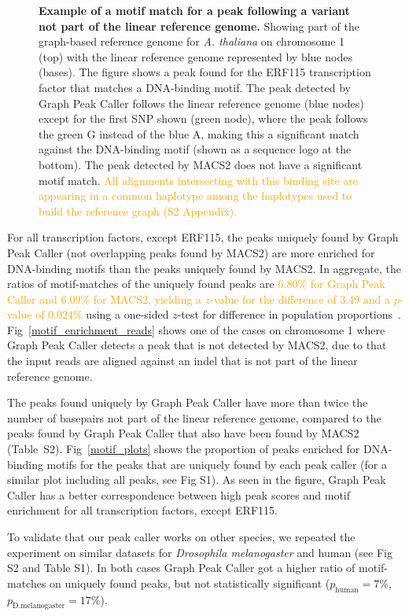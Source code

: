 \documentclass[10pt,letterpaper]{article}
\newcommand{\revision}[1]{\textcolor{orange}{#1}}
\begin{document}
\begin{figure} %
 \caption{{\bf Example of a motif match for a peak following a variant not part of the linear reference genome.} Showing part of the graph-based reference genome for \emph{A. thaliana} on chromosome 1 (top) with the linear reference genome represented by blue nodes (bases). The figure shows a peak found for the ERF115 transcription
factor that matches a DNA-binding motif. The peak detected by Graph Peak Caller follows the linear reference genome (blue nodes) except for the first SNP shown (green node), where the peak follows the green G instead of the blue A, making this a significant match against the DNA-binding motif (shown as a sequence logo at the bottom). The peak detected by MACS2 does not have a significant motif match. \revision{All alignments intersecting with this binding site are appearing in a common haplotype among the haplotypes used to build the reference graph (S2 Appendix).}}
\label{motif_enrichment}
\end{figure}


For all transcription factors, except ERF115, the peaks uniquely found by Graph Peak Caller (not overlapping peaks found by MACS2) are more enriched for DNA-binding motifs than the peaks uniquely found by MACS2. In aggregate, the ratios of motif-matches of the uniquely found peaks are \revision{$6.80\%$ for Graph Peak Caller and $6.09\%$ for MACS2, yielding a $z$-value for the difference of $3.49$ and a $p$-value of $0.024\%$} using a one-sided $z$-test for difference in population proportions~\cite{devoreberk}. Fig~\ref{motif_enrichment_reads} shows one of the cases on chromosome 1 where Graph Peak Caller detects a peak that is not detected by MACS2, due to that the input reads are aligned against an indel that is not part of the linear reference genome. 

The peaks found uniquely by Graph Peak Caller have more than twice the number of basepairs not part of the linear reference genome, compared to the peaks found by Graph Peak Caller that also have been found by MACS2 (Table~S2). Fig~\ref{motif_plots} shows the proportion of peaks enriched for DNA-binding motifs for the peaks that are uniquely found by each peak caller (for a similar plot including all peaks, see Fig S1). As seen in the figure, Graph Peak Caller has a better correspondence between high peak scores and motif enrichment for all transcription factors, except ERF115. 


To validate that our peak caller works on other species, we repeated the experiment on similar datasets for \emph{Drosophila melanogaster } and human (see Fig S2 and Table S1). In both cases Graph Peak Caller got a higher ratio of motif-matches on uniquely found peaks, but not statistically significant ($p_{\text{human}}=7\%$, $p_{\text{D.melanogaster}}=17\%$).
\end{document}

